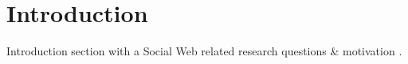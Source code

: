 \section{Introduction}

Introduction section with a Social Web related research questions \& motivation \cite{knuth:1984}.